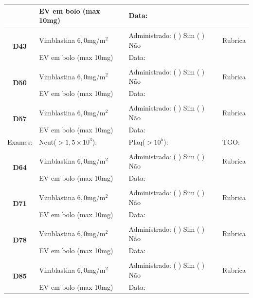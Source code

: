 \documentclass[11pt,a4paper,oldfontcommands]{memoir}
\begin{document}
\begin{center}
\begin{table}[H]
\begin{tabular}{p{}p{}|p{}|p{3cm}}
    \multicolumn{1}{c|}{}&{EV em bolo (max 10mg)}&{Data:}&\\
    \hline
    \\
    \hline
    \multicolumn{1}{c|}{\multirow{2}{*}{\textbf{D43}}}&{Vimblastina \(6,0\)mg/m\(^2\)}&{Administrado: (  ) Sim (  ) Não}&{Rubrica}\\
    \multicolumn{1}{c|}{}&{EV em bolo (max 10mg)}&{Data:}&\\
    \hline
    \\
    \hline
    \multicolumn{1}{c|}{\multirow{2}{*}{\textbf{D50}}}&{Vimblastina \(6,0\)mg/m\(^2\)}&{Administrado: (  ) Sim (  ) Não}&{Rubrica}\\
    \multicolumn{1}{c|}{}&{EV em bolo (max 10mg)}&{Data:}&\\
    \hline
    \\
    \hline
    \multicolumn{1}{c|}{\multirow{2}{*}{\textbf{D57}}}&{Vimblastina \(6,0\)mg/m\(^2\)}&{Administrado: (  ) Sim (  ) Não}&{Rubrica}\\
    \multicolumn{1}{c|}{}&{EV em bolo (max 10mg)}&{Data:}&\\
    \hline
    {Exames:}&{Neut(\(>1,5\times10^3\)):}&{Plaq(\(>10^5\)):}&{TGO:}
    \\
    \hline
    \\
    \hline
    \multicolumn{1}{c|}{\multirow{2}{*}{\textbf{D64}}}&{Vimblastina \(6,0\)mg/m\(^2\)}&{Administrado: (  ) Sim (  ) Não}&{Rubrica}\\
    \multicolumn{1}{c|}{}&{EV em bolo (max 10mg)}&{Data:}&\\
    \hline
    \\
    \hline
    \multicolumn{1}{c|}{\multirow{2}{*}{\textbf{D71}}}&{Vimblastina \(6,0\)mg/m\(^2\)}&{Administrado: (  ) Sim (  ) Não}&{Rubrica}\\
    \multicolumn{1}{c|}{}&{EV em bolo (max 10mg)}&{Data:}&\\
    \hline
    \\
    \hline
    \multicolumn{1}{c|}{\multirow{2}{*}{\textbf{D78}}}&{Vimblastina \(6,0\)mg/m\(^2\)}&{Administrado: (  ) Sim (  ) Não}&{Rubrica}\\
    \multicolumn{1}{c|}{}&{EV em bolo (max 10mg)}&{Data:}&\\
    \hline
    \\
    \hline
    \multicolumn{1}{c|}{\multirow{2}{*}{\textbf{D85}}}&{Vimblastina \(6,0\)mg/m\(^2\)}&{Administrado: (  ) Sim (  ) Não}&{Rubrica}\\
    \multicolumn{1}{c|}{}&{EV em bolo (max 10mg)}&{Data:}&\\

\end{tabular}
\end{table}
\end{center}
\end{document}
